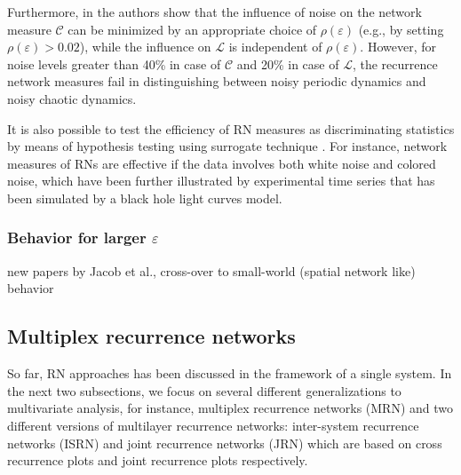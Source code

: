 		Furthermore, in \cite{Subramaniyam2014} the authors show that the influence of noise on the network measure $\mathcal{C}$ can be minimized by an appropriate choice of $\rho(\varepsilon)$ (e.g., by setting $\rho(\varepsilon) > 0.02$), while the influence on $\mathcal{L}$ is independent of $\rho(\varepsilon)$. However, for noise levels greater than 40\% in case of $\mathcal{C}$ and 20\% in case of $\mathcal{L}$, the recurrence network measures fail in distinguishing between noisy periodic dynamics and noisy chaotic dynamics. 
		
		It is also possible to test the efficiency of RN measures as discriminating statistics by means of hypothesis testing using surrogate technique \cite{Jacob2018}. For instance, network measures of RNs are effective if the data involves both white noise and colored noise, which have been further illustrated by experimental time series that has been simulated by a black hole light curves model.          
        
        		\subsubsection{Behavior for larger $\varepsilon$}
        new papers by Jacob et al., cross-over to small-world (spatial network like) behavior

	
	\subsection{Multiplex recurrence networks}
	So far, RN approaches has been discussed in the framework of a single system. In the next two subsections, we focus on several different generalizations to multivariate analysis, for instance, multiplex recurrence networks (MRN) and two different versions of multilayer recurrence networks: inter-system recurrence networks (ISRN) and joint recurrence networks (JRN) which are based on cross recurrence plots and joint recurrence plots respectively. 

